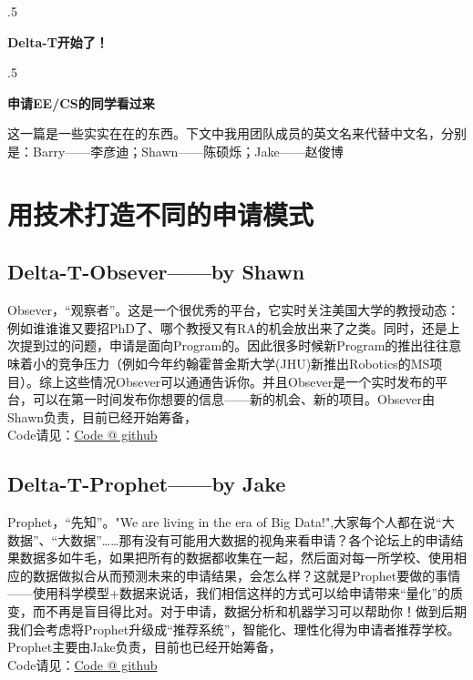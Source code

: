 \documentclass{article}
\begin{document}
\moveleft.5\hoffset\centerline{\huge\bf Delta-T开始了！ }
\vspace{5pt}
\moveleft.5\hoffset\centerline{\large\bf 申请EE/CS的同学看过来 }
\vspace{15pt}
这一篇是一些实实在在的东西。下文中我用团队成员的英文名来代替中文名，分别是：\textcolor{colorname}{Barry}——李彦迪；\textcolor{colorname}{Shawn}——陈硕烁；\textcolor{colorname}{Jake}——赵俊博

\section{用技术打造不同的申请模式}
\subsection{Delta-T-Obsever——by Shawn}
Obsever，“观察者”。这是一个很优秀的平台，它实时关注美国大学的教授动态：例如谁谁谁又要招PhD了、哪个教授又有RA的机会放出来了之类。同时，还是上次提到过的问题，申请是面向Program的。因此很多时候新Program的推出往往意味着小的竞争压力（例如今年约翰霍普金斯大学(JHU)新推出Robotics的MS项目）。综上这些情况Obsever可以通通告诉你。并且Obsever是一个实时发布的平台，可以在第一时间发布你想要的信息——新的机会、新的项目。Obsever由Shawn负责，目前已经开始筹备，\\ Code请见：\href{https://github.com/0x000fff/Delta-T-Observer}{\textcolor{colorname}{Code @ github}}
\subsection{Delta-T-Prophet——by Jake}
Prophet，“先知”。"We are living in the era of Big Data!",大家每个人都在说“大数据”、“大数据”……那有没有可能用大数据的视角来看申请？各个论坛上的申请结果数据多如牛毛，如果把所有的数据都收集在一起，然后面对每一所学校、使用相应的数据做拟合从而预测未来的申请结果，会怎么样？这就是Prophet要做的事情——使用科学模型+数据来说话，我们相信这样的方式可以给申请带来“量化”的质变，而不再是盲目得比对。对于申请，数据分析和机器学习可以帮助你！做到后期我们会考虑将Prophet升级成“推荐系统”，智能化、理性化得为申请者推荐学校。Prophet主要由Jake负责，目前也已经开始筹备，\\Code请见：\href{https://github.com/zhaojunbo/Delta-T-Prophet}{\textcolor{colorname}{Code @ github}}
\end{document}
